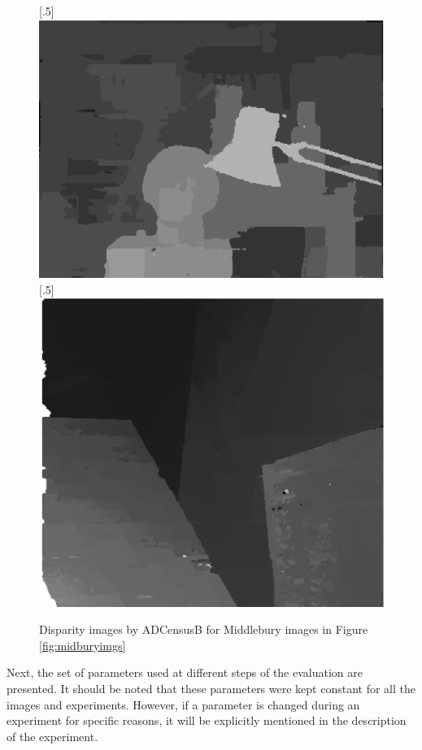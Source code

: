\begin{figure}[H]
\centering
{}
[.5\linewidth]{\includegraphics[scale=0.5]{tsukubadisp}}%
[.5\linewidth]{\includegraphics[scale=0.51]{venusdisp}}%
\caption{Disparity images by ADCensusB for Middlebury images in Figure \protect\ref{fig:midburyimgs}}
\label{fig:midburydisps}
\end{figure}

Next, the set of parameters used at different steps of the evaluation are presented.
It should be noted that these parameters were kept constant for all the images and experiments. However, if a parameter is changed during an experiment for specific
reasons, it will be explicitly mentioned in the description of the experiment.

